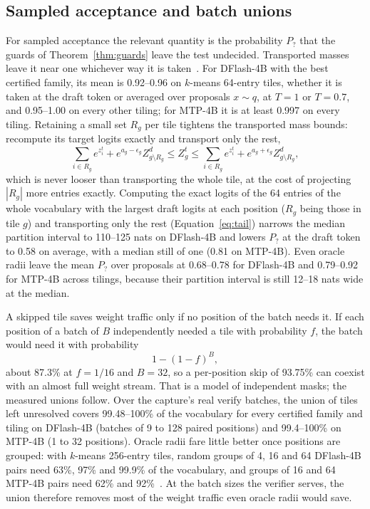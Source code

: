 \subsection{Sampled acceptance and batch unions}\label{app:transport-sampled}
For sampled acceptance the relevant quantity is the probability $P_?$ that the guards of Theorem~\ref{thm:guards} leave the test undecided. Transported masses leave it near one whichever way it is taken~. For DFlash-4B with the best certified family, its mean is 0.92--0.96 on $k$-means 64-entry tiles, whether it is taken at the draft token or averaged over proposals $x\sim q$, at $T=1$ or $T=0.7$, and 0.95--1.00 on every other tiling; for MTP-4B it is at least 0.997 on every tiling. Retaining a small set $R_g$ per tile tightens the transported mass bounds: recompute its target logits exactly and transport only the rest,
\begin{equation}
\sum_{i\in R_g}e^{z_i^t}+e^{a_g-\epsilon_g}Z^d_{g\setminus R_g}\le Z_g^t\le\sum_{i\in R_g}e^{z_i^t}+e^{a_g+\epsilon_g}Z^d_{g\setminus R_g},\label{eq:tail}
\end{equation}
which is never looser than transporting the whole tile, at the cost of projecting $|R_g|$ more entries exactly.
Computing the exact logits of the 64 entries of the whole vocabulary with the largest draft logits at each position ($R_g$ being those in tile $g$) and transporting only the rest (Equation~\eqref{eq:tail}) narrows the median partition interval to 110--125 nats on DFlash-4B and lowers $P_?$ at the draft token to 0.58 on average, with a median still of one (0.81 on MTP-4B). Even oracle radii leave the mean $P_?$ over proposals at 0.68--0.78 for DFlash-4B and 0.79--0.92 for MTP-4B across tilings, because their partition interval is still 12--18 nats wide at the median.

A skipped tile saves weight traffic only if no position of the batch needs it. If each position of a batch of $B$ independently needed a tile with probability $f$, the batch would need it with probability
\begin{equation}1-(1-f)^B,\label{eq:union}\end{equation}
about 87.3\% at $f=1/16$ and $B=32$, so a per-position skip of 93.75\% can coexist with an almost full weight stream. That is a model of independent masks; the measured unions follow. Over the capture's real verify batches, the union of tiles left unresolved covers 99.48--100\% of the vocabulary for every certified family and tiling on DFlash-4B (batches of 9 to 128 paired positions) and 99.4--100\% on MTP-4B (1 to 32 positions). Oracle radii fare little better once positions are grouped: with $k$-means 256-entry tiles, random groups of 4, 16 and 64 DFlash-4B pairs need 63\%, 97\% and 99.9\% of the vocabulary, and groups of 16 and 64 MTP-4B pairs need 62\% and 92\%~. At the batch sizes the verifier serves, the union therefore removes most of the weight traffic even oracle radii would save.


